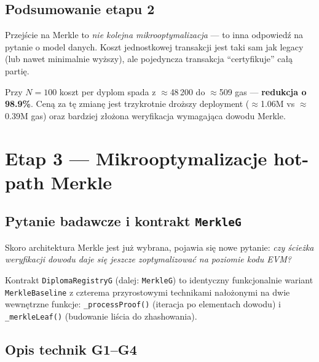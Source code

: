 \documentclass[11pt,a4paper]{article}
\begin{document}
\subsection{Podsumowanie etapu 2}

Przejście na Merkle to \emph{nie kolejna mikrooptymalizacja} ---
to inna odpowiedź na pytanie o model danych.
Koszt jednostkowej transakcji jest taki sam jak legacy (lub nawet minimalnie wyższy),
ale pojedyncza transakcja ``certyfikuje'' całą partię.

Przy $N=100$ koszt per dyplom spada z $\approx$48\,200 do $\approx$509 gas ---
\textbf{redukcja o 98.9\%}.
Ceną za tę zmianę jest trzykrotnie droższy deployment ($\approx$1.06M vs $\approx$0.39M gas)
oraz bardziej złożona weryfikacja wymagająca dowodu Merkle.

\section{Etap 3 --- Mikrooptymalizacje hot-path Merkle}

\subsection{Pytanie badawcze i kontrakt \texttt{MerkleG}}

Skoro architektura Merkle jest już wybrana, pojawia się nowe pytanie:
\emph{czy ścieżka weryfikacji dowodu daje się jeszcze zoptymalizować
na poziomie kodu EVM?}

Kontrakt \texttt{DiplomaRegistryG} (dalej: \texttt{MerkleG}) to identyczny
funkcjonalnie wariant \texttt{MerkleBaseline} z czterema przyrostowymi
technikami nałożonymi na dwie wewnętrzne funkcje:
\texttt{\_processProof()} (iteracja po elementach dowodu) i \texttt{\_merkleLeaf()}
(budowanie liścia do zhashowania).

\subsection{Opis technik G1--G4}
\end{document}
